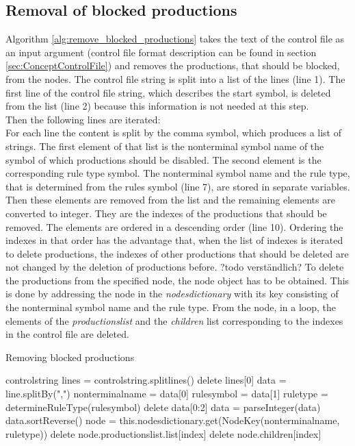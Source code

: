 \subsection{Removal of blocked productions}
Algorithm \ref{alg:remove_blocked_productions} takes the text of the control file as an input argument (control file format description can be found in section \ref{sec:ConceptControlFile}) and removes the productions, that should be blocked, from the nodes.  
The control file string is split into a list of the lines (line 1).
The first line of the control file string, which describes the start symbol, is deleted from the list (line 2) because this information is not needed at this step.\\
Then the following lines are iterated:\\
For each line the content is split by the comma symbol, which produces a list of strings.
The first element of that list is the nonterminal symbol name of the symbol of which productions should be disabled.
The second element is the corresponding rule type symbol.
The nonterminal symbol name and the rule type, that is determined from the rules symbol (line 7), are stored in separate variables.
Then these elements are removed from the list and the remaining elements are converted to integer.
They are the indexes of the productions that should be removed.
The elements are ordered in a descending order (line 10).
Ordering the indexes in that order has the advantage that, when the list of indexes is iterated to delete productions, the indexes of other productions that should be deleted are not changed by the deletion of productions before. ?todo verständlich?
To delete the productions from the specified node, the node object has to be obtained.
This is done by addressing the node in the \textit{nodes\textunderscore dictionary} with its key consisting of the nonterminal symbol name and the rule type.
From the node, in a loop, the elements of the \textit{productions\textunderscore list} and the \textit{children} list corresponding to the indexes in the control file are deleted.

\begin{algorithm}[H]
\caption{Removing blocked productions}
\begin{algorithmic}[1] 
\Require control\textunderscore string
\State lines = control\textunderscore string.splitlines()
\State delete lines[0]
	\State data = line.splitBy(",")
	\State nonterminal\textunderscore name = data[0] 
	\State rule\textunderscore symbol = data[1]
	\State rule\textunderscore type = determineRuleType(rule\textunderscore symbol)
	\State delete data[0:2]
	\State data = parseInteger(data)
	\State data.sortReverse()
	\State node = this.nodes\textunderscore dictionary.get(Node\textunderscore Key(nonterminal\textunderscore name, rule\textunderscore type))
		\State delete node.productions\textunderscore list.list[index]
		\State delete node.children[index]
	\EndFor
\EndFor
\end{algorithmic}
\label{alg:remove_blocked_productions}
\end{algorithm}

